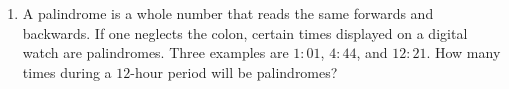 \documentclass{article}
\begin{document}
\begin{multicols*}{2}
\begin{enumerate}
\begin{center}
            \end{center}
            \vspace{3cm}
        \item A palindrome is a whole number that reads the same forwards and backwards.
            If one neglects the colon, certain times displayed on a digital watch are palindromes.
            Three examples are $1\colon 01$, $4\colon 44$, and $12\colon 21$.
            How many times during a $12$-hour period will be palindromes?
            \vspace{3cm}
    \end{enumerate}
\end{multicols*}
\end{document}
